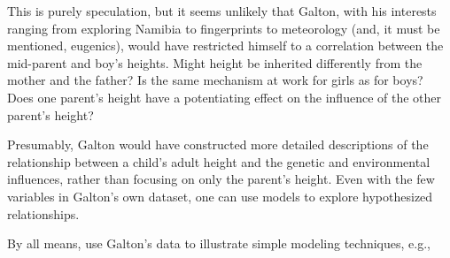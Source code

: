 This is purely speculation, but it seems unlikely that Galton,
with his interests ranging from exploring Namibia to fingerprints to meteorology (and, it
must be mentioned, eugenics), would have restricted himself to a
correlation between the mid-parent and boy's heights.  Might height be
inherited differently from the mother and the father?  Is the same
mechanism at work for girls as for boys?  Does one parent's height
have a potentiating effect on the influence of the other parent's height?

Presumably, Galton would have constructed more detailed descriptions
of the relationship between a child's adult height and the genetic and
environmental influences, rather than focusing on only the parent's
height.  Even with the few variables in Galton's own dataset, one can
use models to explore hypothesized relationships.

By all means, use Galton's data to illustrate simple modeling
techniques, e.g., 
\begin{knitrout}
\end{knitrout}



